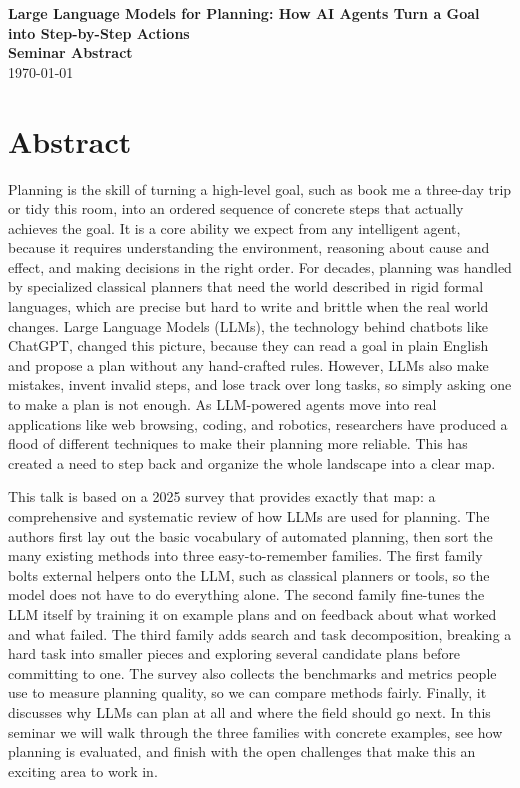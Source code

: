 \documentclass[12pt]{article}
\newcommand{\seminardate}{\today}
\begin{document}
\begin{center}
  {\LARGE\bfseries Large Language Models for Planning: How AI Agents Turn a Goal into Step-by-Step Actions}\\[8pt]
  {\large\bfseries Seminar Abstract}\\[6pt]
  {\normalsize \seminardate}
\end{center}
\vspace{1.5em}

\section*{Abstract}
Planning is the skill of turning a high-level goal, such as book me a three-day trip or tidy this room, into an ordered sequence of concrete steps that actually achieves the goal. It is a core ability we expect from any intelligent agent, because it requires understanding the environment, reasoning about cause and effect, and making decisions in the right order. For decades, planning was handled by specialized classical planners that need the world described in rigid formal languages, which are precise but hard to write and brittle when the real world changes. Large Language Models (LLMs), the technology behind chatbots like ChatGPT, changed this picture, because they can read a goal in plain English and propose a plan without any hand-crafted rules. However, LLMs also make mistakes, invent invalid steps, and lose track over long tasks, so simply asking one to make a plan is not enough. As LLM-powered agents move into real applications like web browsing, coding, and robotics, researchers have produced a flood of different techniques to make their planning more reliable. This has created a need to step back and organize the whole landscape into a clear map.

This talk is based on a 2025 survey that provides exactly that map: a comprehensive and systematic review of how LLMs are used for planning. The authors first lay out the basic vocabulary of automated planning, then sort the many existing methods into three easy-to-remember families. The first family bolts external helpers onto the LLM, such as classical planners or tools, so the model does not have to do everything alone. The second family fine-tunes the LLM itself by training it on example plans and on feedback about what worked and what failed. The third family adds search and task decomposition, breaking a hard task into smaller pieces and exploring several candidate plans before committing to one. The survey also collects the benchmarks and metrics people use to measure planning quality, so we can compare methods fairly. Finally, it discusses why LLMs can plan at all and where the field should go next. In this seminar we will walk through the three families with concrete examples, see how planning is evaluated, and finish with the open challenges that make this an exciting area to work in.
\end{document}
